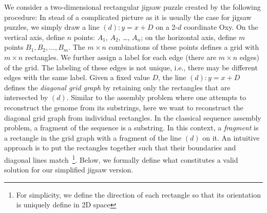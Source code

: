 \documentclass[a4paper]{article}
\begin{document}
We consider a two-dimensional rectangular jigsaw puzzle created by the following procedure:
In stead of a complicated picture as it is usually the case for jigsaw puzzles, we simply draw a line $(d): y = x + D$ on a 2-$d$ coordinate Oxy.
On the vertical axis, define $n$ points: $A_1$, $A_2$, \ldots, $A_n$; on the horizontal axis, define $m$ points
$B_1, B_2, \ldots, B_m$. The $m\times n$ combinations of these points defines a grid with $m\times n$ rectangles.  We further assign a label for each edge (there are
$m\times n$ edges) of the grid. The labeling of these edges is not unique, i.e., there may be different edges with the same label. 
Given a fixed value $D$,  the line $(d): y = x + D$ defines the \emph{diagonal grid graph} by retaining only the rectangles that are intersected by $(d)$.
Similar to the assembly problem where one attempts to reconstruct the genome from its
substrings, here we want to reconstruct the diagonal grid graph from individual rectangles.
In the classical sequence assembly problem, a fragment of the sequence is a substring. In this context, a \emph{fragment} is a
rectangle in the grid graph with a fragment of the line $(d)$ on it. 
An intuitive approach is to put the rectangles together such that their boundaries and diagonal lines match~\footnote{
For simplicity, we define the direction of each rectangle so that its orientation
is uniquely define in 2D space}. Below, we formally define what constitutes
a valid solution for our simplified jigsaw version.
\end{document}
